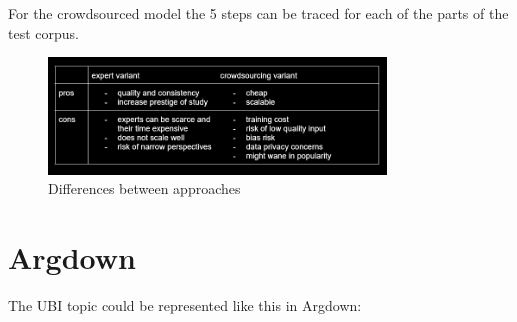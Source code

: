 \documentclass{report}
\begin{document}
For the crowdsourced model the 5 steps can be traced for each of the parts of the test corpus. 
\begin{figure}[h]
    \centering
    \includegraphics[width=0.8\textwidth]{./images/experts-vs-crowdsource.png}
    \caption{Differences between approaches}
\end{figure}


\section{Argdown}

The UBI topic could be represented like this in Argdown:
\end{document}
